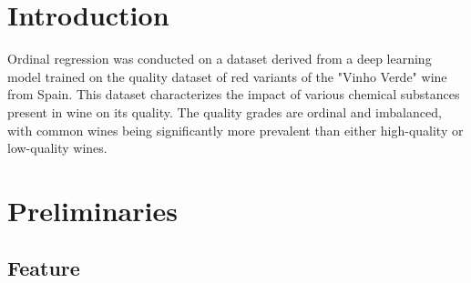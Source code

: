 \section{Introduction}
Ordinal regression was conducted on a dataset derived from a deep learning model trained on the quality dataset of red variants of the "Vinho Verde" wine from Spain. This dataset characterizes the impact of various chemical substances present in wine on its quality. The quality grades are ordinal and imbalanced, with common wines being significantly more prevalent than either high-quality or low-quality wines.


\section{Preliminaries} 
\subsection{Feature}\phantom{...}

